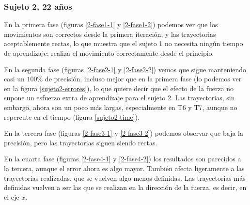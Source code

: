 \documentclass[a4paper,11pt, oneside]{book}
\begin{document}
\subsubsection{Sujeto 2, 22 años}

En la primera fase (figuras \ref{2-fase1-1} y \ref{2-fase1-2}) podemos ver que los movimientos son correctos desde la primera iteración, y las trayectorias aceptablemente rectas, lo que muestra que el sujeto 1 no necesita ningún tiempo de aprendizaje: realiza el movimiento correctamente desde el principio.


En la segunda fase (figuras \ref{2-fase2-1} y \ref{2-fase2-2}) vemos que sigue manteniendo casi un $100\%$ de precisión, incluso mejor que en la primera fase (lo podemos ver en la figura \ref{sujeto2-errores}), lo que quiere decir que el efecto de la fuerza no supone un esfuerzo extra de aprendizaje para el sujeto 2. Las trayectorias, sin embargo, ahora son un poco más largas, especialmente en T6 y T7, aunque no repercute en el tiempo (figura \ref{sujeto2-time}).

En la tercera fase (figuras \ref{2-fase3-1} y \ref{2-fase3-2}) podemos observar que baja la precisión, pero las trayectorias siguen siendo rectas. 

En la cuarta fase (figuras \ref{2-fase4-1} y \ref{2-fase4-2}) los resultados son parecidos a la tercera, aunque el error ahora es algo mayor. También afecta ligeramente a las trayectorias realizadas, que se vuelven algo menos definidas. Las trayectorias más definidas vuelven a ser las que se realizan en la dirección de la fuerza, es decir, en el eje $x$.
\end{document}

